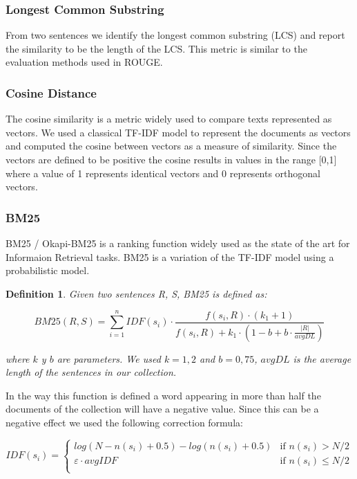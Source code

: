 \documentclass{llncs}
\newtheorem{definicion}{Definition}
\begin{document}
\subsubsection{Longest Common Substring}
From two sentences we identify the longest common substring (LCS) and report the similarity to be the length of the LCS. This metric is similar to the evaluation methods used in ROUGE.

\subsubsection{Cosine Distance}
The cosine similarity is a metric widely used to compare texts represented as vectors. We used a classical TF-IDF model to represent the documents as vectors and computed the cosine between vectors as a measure of similarity. Since the vectors are defined to be positive the cosine results in values in the range [0,1] where a value of 1 represents identical vectors and 0 represents orthogonal vectors.

\subsubsection{BM25}
BM25 / Okapi-BM25 is a ranking function widely used as the state of the art for Informaion Retrieval tasks. BM25 is a variation of the TF-IDF model using a probabilistic model.

\begin{definicion}
Given two sentences R, S, BM25 is defined as:

\begin{equation}
BM25(R,S) = \sum_{i=1}^{n} IDF(s_i) \cdot \frac{f(s_i, R) \cdot (k_1 + 1)}{f(s_i, R) + k_1 \cdot (1 - b + b \cdot \frac{|R|}{avgDL})}
\end{equation}

where $k$ y $b$ are parameters. We used $k = 1,2$ and $b = 0,75$,  $avgDL$ is the average length of the sentences in our collection.
\end{definicion}

In the way this function is defined a word appearing in more than half the documents of the collection will have a negative value. Since this can be a negative effect we used the following correction formula:
                
\begin{equation}
 IDF(s_i) =
  \begin{cases}
       log(N - n(s_i) + 0.5) - log(n(s_i) + 0.5)    & \text{if }  n(s_i) > N/2\\
       \varepsilon \cdot avgIDF                     & \text{if }  n(s_i) \leq N/2\\
  \end{cases}
\end{equation}                
                
\end{document}
